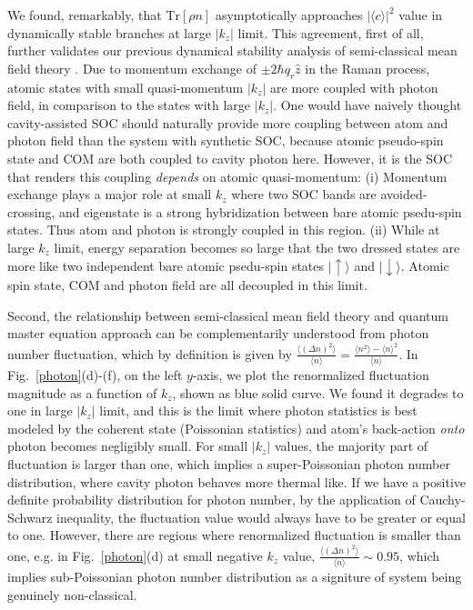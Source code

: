 \documentclass[atoms,article,submit,moreauthors,pdftex,12pt,a4paper]{mdpi}
\begin{document}
We found, remarkably, that $\text{Tr}[\rho n]$ asymptotically approaches $|\langle c\rangle|^2$ value in dynamically stable branches at large $|k_z|$ limit. 
This agreement, first of all, further validates our previous dynamical stability analysis of semi-classical mean field theory \cite{cavitySOC}. Due to momentum exchange of $\pm2\hbar q_r\hat{z}$ in the Raman process, atomic states with small quasi-momentum $|k_z|$ are more coupled with photon field, in comparison to the states with large  $|k_z|$. One would have naively thought cavity-assisted SOC should naturally provide more coupling between atom and photon field than the system with synthetic SOC, because atomic pseudo-spin state and COM are both coupled to cavity photon here. However, it is the SOC that renders this coupling {\em depends} on atomic quasi-momentum: (i) Momentum exchange plays a major role at small $k_z$ where two SOC bands are avoided-crossing, and eigenstate is a strong hybridization between bare atomic psedu-spin states. Thus atom and photon is strongly coupled in this region. (ii) While at large $k_z$ limit, energy separation becomes so large that the two dressed states are more like two independent bare atomic psedu-spin states $|\uparrow\rangle$ and $|\downarrow\rangle$. Atomic spin state, COM and photon field are all decoupled in this limit. 
 
Second, 
the relationship between semi-classical mean field theory and quantum master equation approach can be complementarily understood from photon number fluctuation, which by definition is given by $\frac{\langle(\Delta n)^{2}\rangle}{\langle n\rangle}=\frac{\langle n^{2}\rangle-\langle n\rangle^{2}}{\langle n\rangle}$. In Fig.~\ref{photon}(d)-(f), on the left $y$-axis, we plot the renormalized fluctuation magnitude as a function of $k_z$, shown as blue solid curve. We found it degrades to one in large $|k_z|$ limit, and this is the limit where photon statistics is best modeled by the coherent state (Poissonian statistics) and atom's back-action {\em onto} photon becomes negligibly small. 
For small $|k_z|$ values, the majority part of fluctuation is larger than one, which implies a super-Poissonian photon number distribution, where cavity photon behaves more thermal like. If we have a  positive definite probability distribution for photon number, by the application of Cauchy-Schwarz inequality, the fluctuation value would always have to be greater or equal to one. However, there are regions where renormalized fluctuation is smaller than one, e.g. in Fig.~\ref{photon}(d) at small negative $k_z$ value,  $\frac{\langle(\Delta n)^{2}\rangle}{\langle n\rangle} \sim 0.95$, which implies sub-Poissonian photon number distribution as a signiture of system being genuinely non-classical. 
\end{document}
